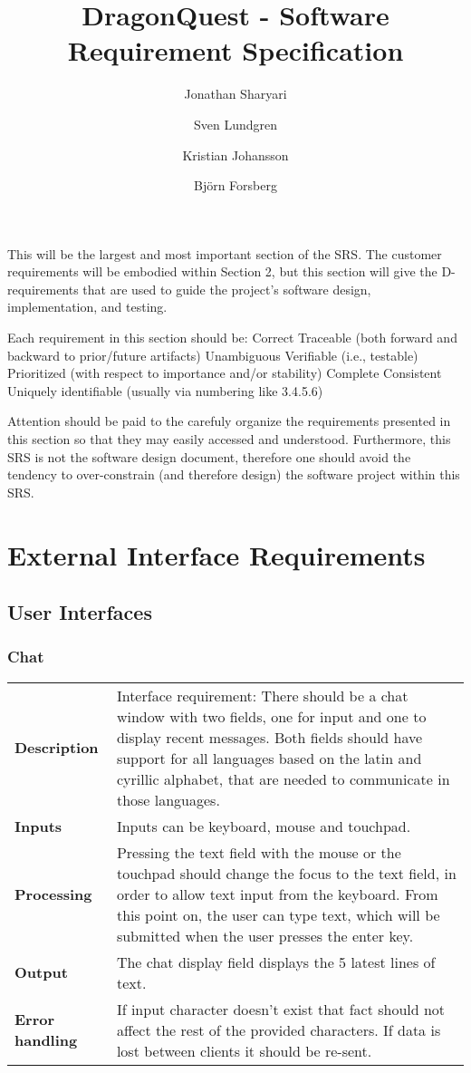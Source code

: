 \documentclass[a4paper,10pt]{article}
\title{\textbf{DragonQuest - Software Requirement Specification}}
\author{Jonathan Sharyari \and Sven Lundgren \and Kristian Johansson \and Bj{\"o}rn Forsberg}
\newcommand{\requirement}[1]{\subsubsection{#1}\begin{tabular}{l p{12.2cm}}}
\newcommand{\reqsection}[1]{\\ \textbf{#1} &}
\newcommand{\stoprequirement}{\end{tabular}}
\begin{document}
\maketitle
This will be the largest and most important section of the SRS. The customer requirements will be embodied within Section 2, but this section will give the D-requirements that are used to guide the project's software design, implementation, and testing.

Each requirement in this section should be:
Correct
Traceable (both forward and backward to prior/future artifacts)
Unambiguous
Verifiable (i.e., testable)
Prioritized (with respect to importance and/or stability)
Complete
Consistent
Uniquely identifiable (usually via numbering like 3.4.5.6)

Attention should be paid to the carefuly organize the requirements presented in this section so that they may easily accessed and understood.  Furthermore, this SRS is not the software design document, therefore one should avoid the tendency to over-constrain (and therefore design) the software project within this SRS.

\section{External Interface Requirements}
\subsection{User Interfaces}

\requirement{Chat}
\reqsection{Description}
Interface requirement: There should be a chat window with two fields, one for input and one to display recent messages. Both fields should have support for all languages based on the latin and cyrillic alphabet, that are needed to communicate in those languages.

\reqsection{Inputs}
Inputs can be keyboard, mouse and touchpad.

\reqsection{Processing}
Pressing the text field with the mouse or the touchpad should change the focus to the text field, in order to allow text input from the keyboard. From this point on, the user can type text, which will be submitted when the user presses the enter key. 

\reqsection{Output}
The chat display field displays the 5 latest lines of text. 

\reqsection{Error handling}
If input character doesn't exist that fact should not affect the rest of the provided characters. If data is lost between clients it should be re-sent.
\stoprequirement
\end{document}

